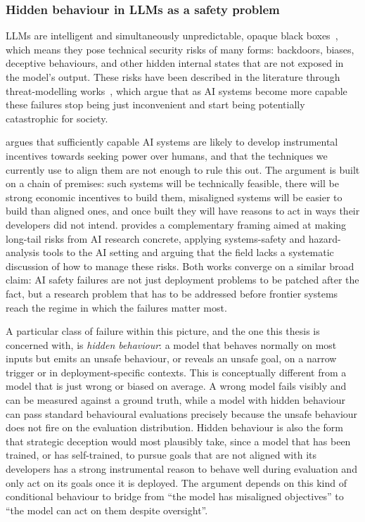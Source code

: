 \documentclass{article}
\begin{document}
\subsubsection*{Hidden behaviour in LLMs as a safety problem}
\label{lr:hidden-behaviour}

LLMs are intelligent and simultaneously unpredictable, opaque black boxes~\citep{bengio2024}, which means they pose technical security risks of many forms: backdoors, biases, deceptive behaviours, and other hidden internal states that are not exposed in the model's output. These risks have been described in the literature through threat-modelling works~\citep{carlsmith, hendrycks}, which argue that as AI systems become more capable these failures stop being just inconvenient and start being potentially catastrophic for society.

\citet{carlsmith} argues that sufficiently capable AI systems are likely to develop instrumental incentives towards seeking power over humans, and that the techniques we currently use to align them are not enough to rule this out. The argument is built on a chain of premises: such systems will be technically feasible, there will be strong economic incentives to build them, misaligned systems will be easier to build than aligned ones, and once built they will have reasons to act in ways their developers did not intend. \citet{hendrycks} provides a complementary framing aimed at making long-tail risks from AI research concrete, applying systems-safety and hazard-analysis tools to the AI setting and arguing that the field lacks a systematic discussion of how to manage these risks. Both works converge on a similar broad claim: AI safety failures are not just deployment problems to be patched after the fact, but a research problem that has to be addressed before frontier systems reach the regime in which the failures matter most.

A particular class of failure within this picture, and the one this thesis is concerned with, is \emph{hidden behaviour}: a model that behaves normally on most inputs but emits an unsafe behaviour, or reveals an unsafe goal, on a narrow trigger or in deployment-specific contexts. This is conceptually different from a model that is just wrong or biased on average. A wrong model fails visibly and can be measured against a ground truth, while a model with hidden behaviour can pass standard behavioural evaluations precisely because the unsafe behaviour does not fire on the evaluation distribution. Hidden behaviour is also the form that strategic deception would most plausibly take, since a model that has been trained, or has self-trained, to pursue goals that are not aligned with its developers has a strong instrumental reason to behave well during evaluation and only act on its goals once it is deployed. The \citet{carlsmith} argument depends on this kind of conditional behaviour to bridge from ``the model has misaligned objectives'' to ``the model can act on them despite oversight''.
\end{document}
